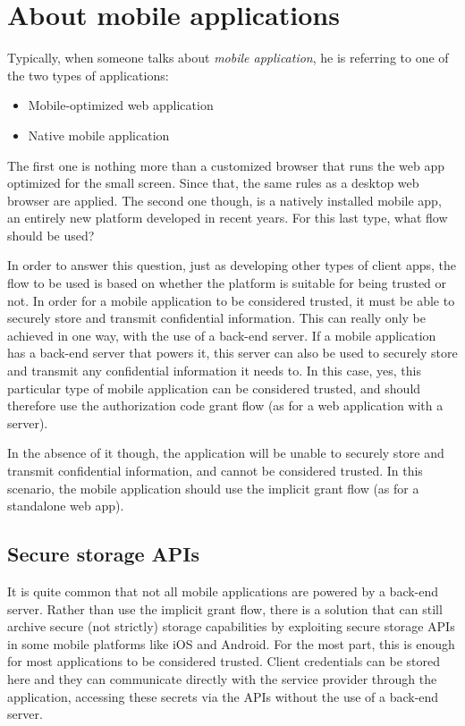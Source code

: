\section{About mobile applications}
Typically, when someone talks about \textit{mobile application}, he is referring to one of the two types of applications:

\begin{itemize}
    \item Mobile-optimized web application
    \item Native mobile application
\end{itemize}

The first one is nothing more than a customized browser that runs the web app optimized for the small screen. Since that, the same rules as a desktop web browser are applied.
The second one though, is a natively installed mobile app, an entirely new platform developed in recent years. For this last type, what flow should be used? 

In order to answer this question, just as developing other types of client apps, the flow to be used is based on whether the platform is suitable for being trusted or not. In order for a mobile application to be considered trusted, it must be able to securely store and transmit confidential information. This can really only be achieved in
one way, with the use of a back-end server. If a mobile application has a back-end server that powers it, this server can also be used to securely store and transmit any confidential information it needs to. In this case, yes, this particular type of mobile application can be considered trusted, and should therefore use the authorization code grant flow (as for a web application with a server). 

In the absence of it though, the application will be unable to securely store and transmit confidential information, and cannot be considered trusted. In this scenario, the mobile application should use the implicit grant flow (as for a standalone web app).


\subsection{Secure storage APIs}
It is quite common that not all mobile applications are powered by a back-end server. Rather than use the implicit grant flow, there is a solution that can still archive secure (not strictly) storage capabilities by exploiting secure storage APIs in some mobile platforms like iOS and Android.  For the most part, this is enough for most applications to be considered trusted. Client credentials can be stored here and they can communicate directly with the service provider through the application, accessing these secrets via the APIs without the use of a back-end server.


